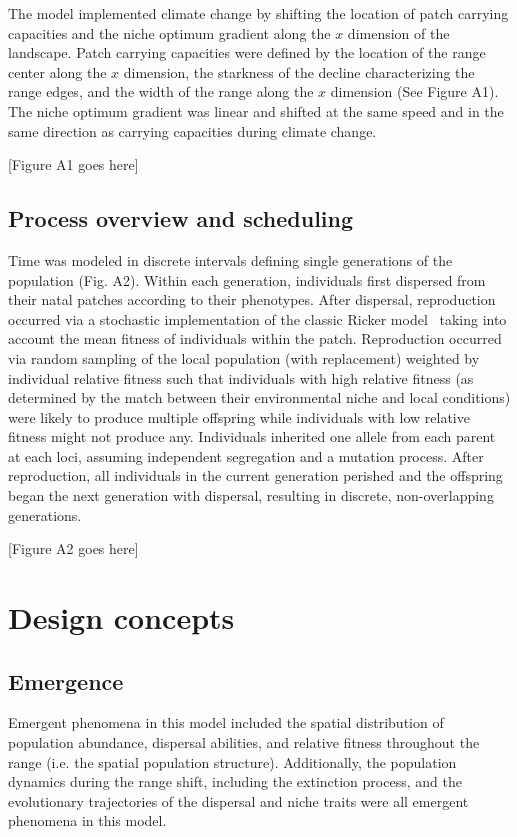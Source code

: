 \documentclass[11pt]{article}
\begin{document}
The model implemented climate change by shifting the location of patch carrying capacities and the niche optimum gradient along the $x$ dimension of the landscape. Patch carrying capacities were defined by the location of the range center along the $x$ dimension, the starkness of the decline characterizing the range edges, and the width of the range along the $x$ dimension (See Figure A1). The niche optimum gradient was linear and shifted at the same speed and in the same direction as carrying capacities during climate change.

[Figure A1 goes here]

\subsection*{Process overview and scheduling} 
Time was modeled in discrete intervals defining single generations of the population (Fig. A2). Within each generation, individuals first dispersed from their natal patches according to their phenotypes. After dispersal, reproduction occurred via a stochastic implementation of the classic Ricker model~\citep{ricker1954stock} taking into account the mean fitness of individuals within the patch. Reproduction occurred via random sampling of the local population (with replacement) weighted by individual relative fitness such that individuals with high relative fitness (as determined by the match between their environmental niche and local conditions) were likely to produce multiple offspring while individuals with low relative fitness might not produce any. Individuals inherited one allele from each parent at each loci, assuming independent segregation and a mutation process. After reproduction, all individuals in the current generation perished and the offspring began the next generation with dispersal, resulting in discrete, non-overlapping generations. 

[Figure A2 goes here]

\section*{Design concepts}
\subsection*{Emergence} 
Emergent phenomena in this model included the spatial distribution of population abundance, dispersal abilities, and relative fitness throughout the range (i.e. the spatial population structure). Additionally, the population dynamics during the range shift, including the extinction process, and the evolutionary trajectories of the dispersal and niche traits were all emergent phenomena in this model.
\end{document}
